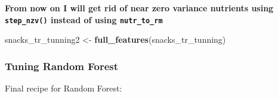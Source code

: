 \documentclass[
]{article}
\newenvironment{Shaded}{\begin{snugshade}}{\end{snugshade}}
\newcommand{\KeywordTok}[1]{\textcolor[rgb]{0.13,0.29,0.53}{\textbf{#1}}}
\newcommand{\NormalTok}[1]{#1}
\newcommand{\StringTok}[1]{\textcolor[rgb]{0.31,0.60,0.02}{#1}}
\begin{document}
\textbf{From now on I will get rid of near zero variance nutrients using
\texttt{step\_nzv()} instead of using \texttt{nutr\_to\_rm}}

\begin{Shaded}
\begin{Highlighting}[]
\NormalTok{snacks_tr_tunning2 <-}\StringTok{ }\KeywordTok{full_features}\NormalTok{(snacks_tr_tunning)}
\end{Highlighting}
\end{Shaded}

\hypertarget{tuning-random-forest}{%
\subsubsection{Tuning Random Forest}\label{tuning-random-forest}}

Final recipe for Random Forest:
\end{document}
